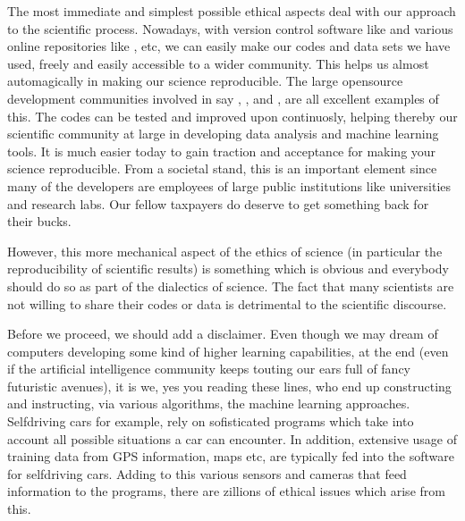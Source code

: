 \documentclass[letterpaper,10pt,english]{sphinxmanual}
\begin{document}
The most immediate and simplest possible ethical aspects deal with our
approach to the scientific process. Nowadays, with version control
software like  and various online
repositories like ,
 etc, we can easily make our codes
and data sets we have used, freely and easily accessible to a wider
community. This helps us almost automagically in making our science
reproducible. The large open\sphinxhyphen{}source development communities involved
in say ,
,
 and , are
all excellent examples of this. The codes can be tested and improved
upon continuosly, helping thereby our scientific community at large in
developing data analysis and machine learning tools.  It is much
easier today to gain traction and acceptance for making your science
reproducible. From a societal stand, this is an important element
since many of the developers are employees of large public institutions like
universities and research labs. Our fellow taxpayers do deserve to get
something back for their bucks.

However, this more mechanical aspect of the ethics of science (in
particular the reproducibility of scientific results) is something
which is obvious and everybody should do so as part of the dialectics of
science.  The fact that many scientists are not willing to share their codes or
data is detrimental to the scientific discourse.

Before we proceed, we should add a disclaimer. Even though
we may dream of computers developing some kind of higher learning
capabilities, at the end (even if the artificial intelligence
community keeps touting our ears full of fancy futuristic avenues), it is we, yes you reading these lines,
who end up constructing and instructing, via various algorithms, the
machine learning approaches. Self\sphinxhyphen{}driving cars for example, rely on sofisticated
programs which take into account all possible situations a car can
encounter. In addition, extensive usage of training data from GPS
information, maps etc, are typically fed into the software for
self\sphinxhyphen{}driving cars. Adding to this various sensors and cameras that
feed information to the programs, there are zillions of ethical issues
which arise from this.
\end{document}
